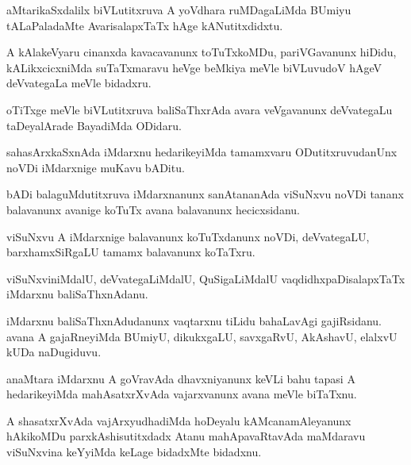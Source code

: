 \documentclass{article}
\begin{document}
\begin{mn}
aMtarikaSxdalilx  biVLutitxruva  A  yoVdhara  ruMDagaLiMda  BUmiyu  tALaPaladaMte  
AvarisalapxTaTx  hAge  kANutitxdidxtu.
\end{mn}

\begin{mn}
A kAlakeVyaru  cinanxda  kavacavanunx  toTuTxkoMDu,  pariVGavanunx  hiDidu,  kALikxcicxniMda  
suTaTxmaravu  heVge  beMkiya meVle  biVLuvudoV  hAgeV  deVvategaLa  meVle  bidadxru.
\end{mn}

\begin{mn}
oTiTxge  meVle  biVLutitxruva  baliSaThxrAda  avara  veVgavanunx  deVvategaLu  
taDeyalArade  BayadiMda  ODidaru. 
\end{mn}

\begin{mn}
sahasArxkaSxnAda  iMdarxnu  hedarikeyiMda  tamamxvaru  ODutitxruvudanUnx  
noVDi  iMdarxnige  muKavu  bADitu.
\end{mn}

\begin{mn}
bADi  balaguMdutitxruva  iMdarxnanunx  sanAtananAda  viSuNxvu  noVDi  tananx  
balavanunx  avanige  koTuTx  avana  balavanunx  hecicxsidanu.
\end{mn}

\begin{mn}
viSuNxvu  A  iMdarxnige  balavanunx  koTuTxdanunx  noVDi,  deVvategaLU,  
barxhamxSiRgaLU  tamamx  balavanunx  koTaTxru.
\end{mn}

\begin{mn}
viSuNxviniMdalU,  deVvategaLiMdalU,  QuSigaLiMdalU  vaqdidhxpaDisalapxTaTx  
iMdarxnu  baliSaThxnAdanu.
\end{mn}

\begin{mn}
iMdarxnu  baliSaThxnAdudanunx  vaqtarxnu  tiLidu  bahaLavAgi  gajiRsidanu.  avana  A  
gajaRneyiMda  BUmiyU,  dikukxgaLU,  savxgaRvU,  AkAshavU,  elalxvU  kUDa  naDugiduvu.
\end{mn}

\begin{mn}
anaMtara  iMdarxnu  A  goVravAda  dhavxniyanunx  keVLi  bahu tapasi  A  hedarikeyiMda  
mahAsatxrXvAda  vajarxvanunx  avana  meVle  biTaTxnu. 
\end{mn}

\begin{mn}
A  shasatxrXvAda  vajArxyudhadiMda  hoDeyalu  kAMcanamAleyanunx  hAkikoMDu  parxkAshisutitxdadx  
Atanu  mahApavaRtavAda  maMdaravu  viSuNxvina  keYyiMda  keLage  bidadxMte  bidadxnu.
\end{mn}
\end{document}
